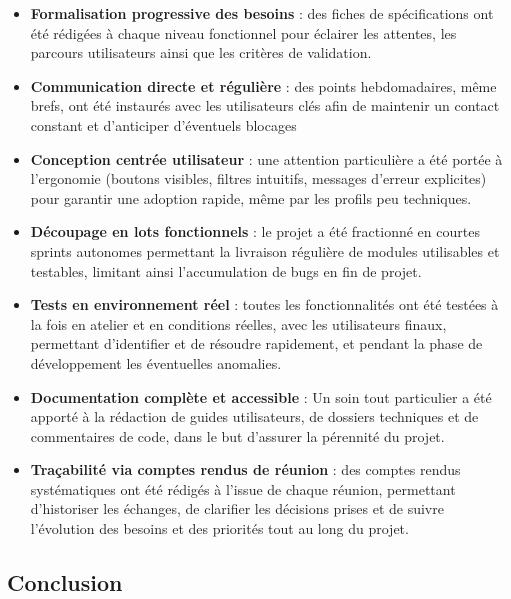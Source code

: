 \documentclass[11pt,a4paper]{article}
\begin{document}
\begin{itemize}
    \item \textbf{Formalisation progressive des besoins} : des fiches de spécifications ont été rédigées à chaque niveau fonctionnel pour éclairer les attentes, les parcours utilisateurs ainsi que les critères de validation.
    
    \item \textbf{Communication directe et régulière} : des points hebdomadaires, même brefs, ont été instaurés avec les utilisateurs clés afin de maintenir un contact constant et d’anticiper d’éventuels blocages

    \item \textbf{Conception centrée utilisateur} : une attention particulière a été portée à l’ergonomie (boutons visibles, filtres intuitifs, messages d’erreur explicites) pour garantir une adoption rapide, même par les profils peu techniques.

    \item \textbf{Découpage en lots fonctionnels} : le projet a été fractionné en courtes sprints autonomes permettant la livraison régulière de modules utilisables et testables, limitant ainsi l’accumulation de bugs en fin de projet.


    \item \textbf{Tests en environnement réel} : toutes les fonctionnalités ont été testées à la fois en atelier et en conditions réelles, avec les utilisateurs finaux, permettant d’identifier et de résoudre rapidement, et pendant la phase de développement les éventuelles anomalies.

    \item \textbf{Documentation complète et accessible} : Un soin tout particulier a été apporté à la rédaction de guides utilisateurs, de dossiers techniques et de commentaires de code, dans le but d’assurer la pérennité du projet.
    
        \item \textbf{Traçabilité via comptes rendus de réunion} : des comptes rendus systématiques ont été rédigés à l’issue de chaque réunion, permettant d’historiser les échanges, de clarifier les décisions prises et de suivre l’évolution des besoins et des priorités tout au long du projet.
\end{itemize}

\newpage
\subsection{Conclusion}
\end{document}
